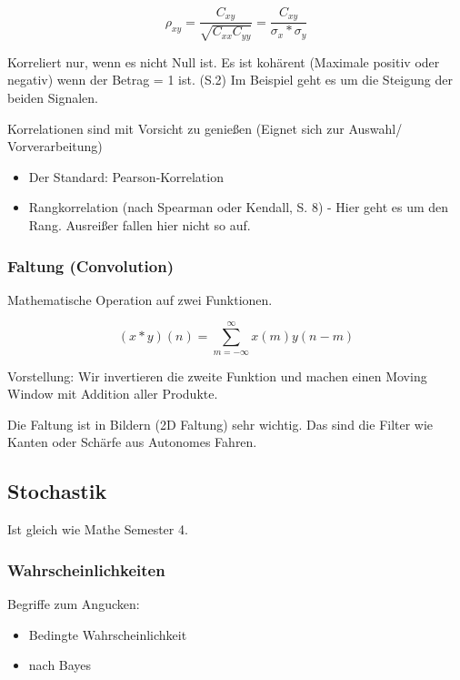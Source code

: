 \documentclass[a4paper]{article}
\begin{document}
$$\rho_{xy} = \frac{C_{xy}}{\sqrt{C_{xx} C_{yy}}} = \frac{C_{xy}}{\sigma_x*\sigma_y}$$

Korreliert nur, wenn es nicht Null ist. Es ist kohärent (Maximale positiv oder negativ) wenn der Betrag = 1 ist. (S.2) Im Beispiel geht es um die Steigung der beiden Signalen.

Korrelationen sind mit Vorsicht zu genießen (Eignet sich zur Auswahl/ Vorverarbeitung)

\begin{itemize}
    \item Der Standard: Pearson-Korrelation
    \item Rangkorrelation (nach Spearman oder Kendall, S. 8) - Hier geht es um den Rang. Ausreißer fallen hier nicht so auf.
\end{itemize}


\subsubsection{Faltung (Convolution)}

Mathematische Operation auf zwei Funktionen.

$$(x\ast y)(n) = \sum_{m=-\infty}^{\infty}x(m)y(n-m)$$

Vorstellung: Wir invertieren die zweite Funktion und machen einen Moving Window mit Addition aller Produkte.

Die Faltung ist in Bildern (2D Faltung) sehr wichtig. Das sind die Filter wie Kanten oder Schärfe aus Autonomes Fahren.

\subsection{Stochastik}

Ist gleich wie Mathe Semester 4.

\subsubsection{Wahrscheinlichkeiten}


Begriffe zum Angucken:

\begin{itemize}
    \item Bedingte Wahrscheinlichkeit
    \item nach Bayes
\end{itemize}
\end{document}
